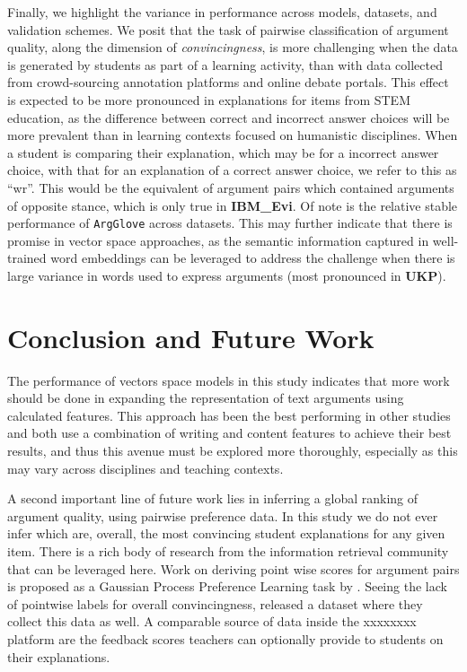 \documentclass[runningheads]{llncs}
\begin{document}
Finally, we highlight the variance in performance across models, datasets, and 
validation schemes. We posit that the task of pairwise classification of 
argument quality, along the dimension of \textit{convincingness}, is more 
challenging when the data is generated by students as part of a learning 
activity, than with data collected from crowd-sourcing annotation platforms and 
online debate portals. 
This effect is expected to be more pronounced in explanations for items from 
STEM education, as the difference between correct and incorrect answer choices 
will be more prevalent than in learning contexts focused on humanistic 
disciplines.
When a student is comparing their explanation, which may be for a incorrect 
answer choice, with that for an explanation of a correct answer choice, we 
refer to this as ``wr''.
This would be the equivalent of argument pairs which contained arguments of 
opposite stance, which is only true in \textbf{IBM\_Evi}.  
Of note is the relative stable performance of \verb|ArgGlove| across datasets. 
This may further indicate that there is promise in vector space approaches, as 
the semantic information captured in well-trained word embeddings can be 
leveraged to address the challenge when there is large variance in words used 
to express arguments (most pronounced in \textbf{UKP}).


\section{Conclusion and Future Work}

The performance of vectors space models in this study indicates that more work 
should be done in expanding the representation of text arguments using 
calculated features.
This approach has been the best performing in other studies~\cite{louis_what_2013,nguyen_computational_2015} and both use a 
combination of writing and content features to achieve their best 
results, and thus this avenue must be explored more thoroughly, especially as 
this may vary across disciplines and teaching contexts. 

A second important line of future work lies in inferring a global ranking of 
argument quality, using pairwise preference data.
In this study we do not ever infer which are, overall, the most convincing 
student explanations for any given item. 
There is a rich body of research from the information retrieval 
community~\cite{chen_pairwise_2013} that can be leveraged here. 
Work on deriving point wise scores for argument pairs is proposed as a Gaussian 
Process Preference Learning task by \cite{simpson_finding_2018}. 
Seeing the lack of pointwise labels for overall convincingness, 
\cite{toledo_automatic_2019} released a dataset where they 
collect this data as well. 
A comparable source of data inside the xxxxxxxx platform are the feedback 
scores teachers can optionally provide to students on their explanations.
\end{document}
